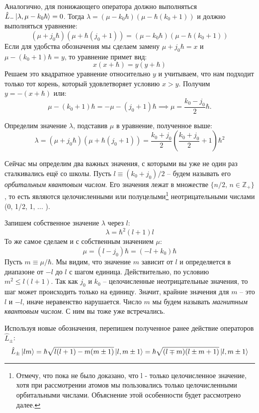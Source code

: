 Аналогично, для понижающего оператора должно выполняться $\hat{L}_-\ket{\lambda,\mu - k_0\hbar} = 0$. Тогда $\lambda = (\mu - k_0\hbar)(\mu-\hbar(k_0 + 1))$ и должно выполняться уравнение:
\[
 (\mu + j_0\hbar)(\mu + \hbar(j_0 + 1))=(\mu - k_0\hbar)(\mu-\hbar(k_0 + 1))
\]
Если для удобства обозначения мы сделаем замену $\mu + j_0\hbar = x$ и $\mu - (k_0 + 1)\hbar = y$, то уравнение примет вид:
\[
x(x+\hbar) = y(y+\hbar)
\]
Решаем это квадратное уравнение относительно $y$ и учитываем, что нам подходит только тот корень, который удовлетворяет условию $x > y$. Получим $y = -(x + \hbar)$ или: 
\[
\mu - (k_0 + 1)\hbar = -\mu - (j_0 + 1)\hbar \implies \mu = \frac{k_0 - j_0}{2}\hbar.
\]

Определим значение $\lambda$, подставив $\mu$ в уравнение, полученное выше:
\[
\lambda = (\mu + j_0\hbar)(\mu + \hbar(j_0+1)) = \frac{k_0 + j_0}{2}\left(\frac{k_0 + j_0}{2} + 1\right)\hbar^2
\]

Сейчас мы определим два важных значения, с которыми вы уже не один раз сталкивались ещё со школы. Пусть $l\equiv (k_0 + j_0)/2$ -- будем называть его \textit{орбитальным квантовым числом}. Его значения лежат в множестве $\{n/2,\, n\in \mathbb{Z}_+\}$, то есть являются целочисленными или полуцелыми\footnote[1]{Отмечу, что пока не было доказано, что l - только целочисленное значение, хотя при рассмотрении атомов мы пользовались только целочисленными орбитальными числами. Объяснение этой особенности будет рассмотрено далее.} неотрицательными числами (0, 1/2, 1, ... ).

Запишем собственное значение $\lambda$  через $l$:
\[
\lambda = \hbar^2(l+1)l
\]
То же самое сделаем и с собственным значением $\mu$:
\[
\mu = (l - j_0)\hbar = (-l + k_0)\hbar
\]
Пусть $m \equiv \mu/\hbar$. Мы видим, что значение $m$ зависит от $l$ и определяется в диапазоне от $-l$ до $l$ с шагом единица. Действительно, по условию $m^2 \leq l(l+1)$. Так как $j_0$ и $k_0$ -- целочисленные неотрицательные значения, то шаг может происходить только на единицу. Значит, крайние значения для $m$ -- это $l$ и $-l$, иначе неравенство нарушается. Число $m$ мы будем называть \textit{магнитным квантовым числом}. С ним вы тоже уже встречались.

Используя новые обозначения, перепишем полученное ранее действие операторов $\hat{L}_{\pm}$:
\[
\hat{L}_{\pm}\ket{lm} = \hbar\sqrt{l(l+1) - m(m \pm 1)}\ket{l, m \pm 1} = \hbar\sqrt{(l \mp m)(l \pm m + 1)}\ket{l,m\pm 1}
\]


